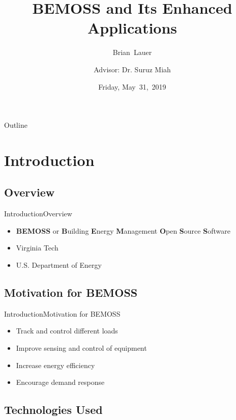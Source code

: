 \documentclass{beamer}
\title[BEMOSS]{BEMOSS and Its Enhanced Applications}
\author[B.~Lauer]{Brian~Lauer\\\and
Advisor: Dr. Suruz Miah}
\institute[Bradley University] %
{
  Department of Electrical and Computer Engineering\\
  Bradley University\\
  1501 W. Bradley Avenue\\
  Peoria, IL, 61625, USA
}
\date[May~31,~2019]{Friday, May~31,~2019}
\begin{document}
\begin{frame}
  \titlepage
\end{frame}

\begin{frame}{Outline}
  \tableofcontents
\end{frame}

\section{Introduction}

\subsection{Overview}

\begin{frame}{Introduction}{Overview}
	\begin{itemize}
		\item \textbf{BEMOSS} or \textbf{B}uilding \textbf{E}nergy \textbf{M}anagement \textbf{O}pen \textbf{S}ource \textbf{S}oftware
		\item Virginia Tech 
		\item U.S. Department of Energy 
	\end{itemize}    
\end{frame}


\subsection{Motivation for BEMOSS} 

\begin{frame}{Introduction}{Motivation for BEMOSS}
	\begin{itemize}
		\item Track and control different loads
		\item Improve sensing and control of equipment
		\item Increase energy efficiency
		\item Encourage demand response
	\end{itemize}
\end{frame}

\subsection{Technologies Used}
\end{document}
